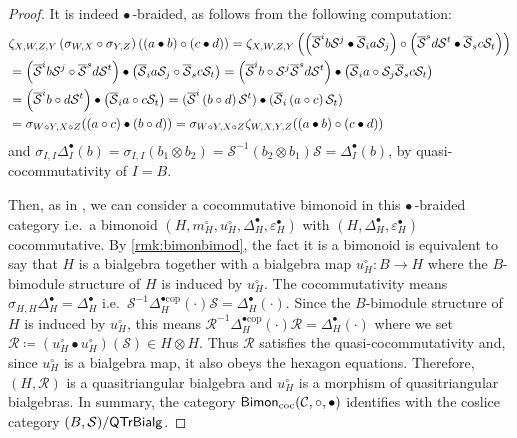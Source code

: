 \documentclass[nosumlimits,twoside]{amsart}
\theoremstyle{definition}
\theoremstyle{remark}
\newcommand{\Cc}{\mathcal{C}}
\newcommand{\Rr}{\mathcal{R}}
\newcommand{\Ss}{\mathcal{S}}
\def\cBimon{{\sf Bimon}_{\mathrm{coc}}}
\def\QTrBialg{{\sf QTrBialg}}
\begin{document}
\begin{proof}
It is indeed $\bullet$\,-braided, as follows from the following computation:
\begin{align*}
&\zeta _{X,W,Z,Y}\left( \sigma _{W,X}\circ \sigma _{Y,Z}\right) (\left(
a\bullet b\right) \circ \left( c\bullet d\right) ) 
=\zeta _{X,W,Z,Y}\left(\left(
\overline{\mathcal{S}}^{i}b\mathcal{S}^{j}\bullet \overline{\mathcal{S}}_{i}a%
\mathcal{S}_{j}\right) \circ \left( \overline{\mathcal{S}}^{s}d\mathcal{S}%
^{t}\bullet \overline{\mathcal{S}}_{s}c\mathcal{S}_{t}\right) \right) \\
&=\left( \overline{\mathcal{S}}^{i}b\mathcal{S}^{j}\circ \overline{\mathcal{%
S}}^{s}d\mathcal{S}^{t}\right) \bullet \left( \overline{\mathcal{S}}_{i}a%
\mathcal{S}_{j}\circ \overline{\mathcal{S}}_{s}c\mathcal{S}_{t}\right)  
=\left( \overline{\mathcal{S}}^{i}b\circ \mathcal{S}^{j}\overline{\mathcal{%
S}}^{s}d\mathcal{S}^{t}\right) \bullet \left( \overline{\mathcal{S}}%
_{i}a\circ \mathcal{S}_{j}\overline{\mathcal{S}}_{s}c\mathcal{S}_{t}\right)
\\
&=\left( \overline{\mathcal{S}}^{i}b\circ d\mathcal{S}^{t}\right) \bullet
\left( \overline{\mathcal{S}}_{i}a\circ c\mathcal{S}_{t}\right)  
=(\overline{\mathcal{S}}^{i}\left( b\circ d\right) \mathcal{S}^{t})\bullet(
\overline{\mathcal{S}}_{i}\left( a\circ c\right) \mathcal{S}_{t}) \\
&=\sigma _{W\circ Y,X\circ Z}(\left( a\circ c\right) \bullet \left( b\circ
d\right))  
=\sigma _{W\circ Y,X\circ Z}\zeta _{W,X,Y,Z}(\left( a\bullet b\right)
\circ \left( c\bullet d\right) )
\end{align*}%
and $\sigma _{I,I}\Delta _{I}^{\bullet }\left( b\right) =\sigma _{I,I}\left(
b_{1}\otimes b_{2}\right) =\mathcal{S}^{-1}\left( b_{2}\otimes b_{1}\right)
\mathcal{S}=\Delta^\bullet_I \left( b\right) $, by quasi-cocommutativity of $I=B$.

Then, as in \cite[Definition 6.31]{Aguiar}, we can consider a cocommutative bimonoid in this $\bullet$\,-braided category i.e.\ a bimonoid $(H,m_H^\circ,u_H^\circ,\Delta_H^\bullet,\varepsilon_H^\bullet)$ with $(H,\Delta_H^\bullet,\varepsilon_H^\bullet)$ cocommutative.
By \cref{rmk:bimonbimod}, the fact it is a bimonoid is equivalent to say that $H$ is a bialgebra together with a bialgebra map $u_H^\circ:B\to H$ where the $B$-bimodule structure of $H$ is induced by $u_H^\circ$. The cocommutativity means $\sigma_{H,H}\Delta_H^\bullet=\Delta_H^\bullet$ i.e.\ $\Ss^{-1}\Delta_H^{\bullet\mathrm{cop}}(\cdot)\Ss=\Delta_H^\bullet(\cdot)$. Since the $B$-bimodule structure of $H$ is induced by $u_H^\circ$, this means $\Rr^{-1}\Delta_H^{\bullet\mathrm{cop}}(\cdot)\Rr=\Delta_H^\bullet(\cdot)$ where we set $\Rr\coloneqq (u_H^\circ\bullet u_H^\circ)(\Ss)\in H\otimes H.$ Thus $\Rr$ satisfies the quasi-cocommutativity and, since $u_H^\circ$ is a bialgebra map, it also obeys the hexagon equations. Therefore, $(H,\Rr)$ is a quasitriangular bialgebra and $u_H^\circ$ is a morphism of quasitriangular bialgebras. In summary, the category $\cBimon(\Cc,\circ,\bullet)$ identifies with the coslice category $(B,\Ss)/\QTrBialg$. \qedhere
\end{proof}
\end{document}
